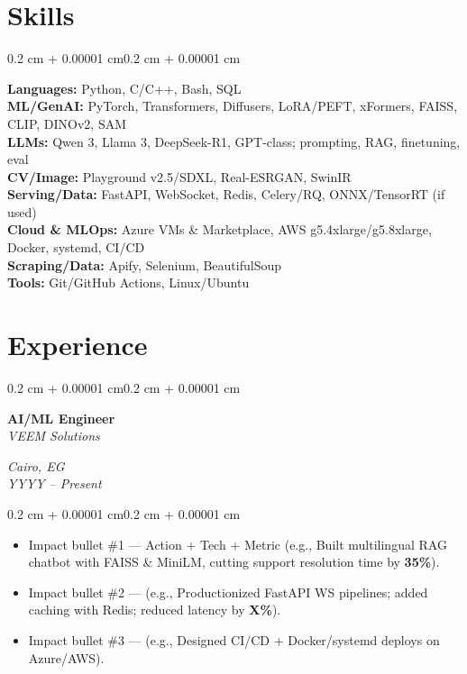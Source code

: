 \documentclass[10pt, letterpaper]{article}
\newenvironment{highlights}{
  \begin{itemize}[
    topsep=0.10 cm,
    parsep=0.10 cm,
    partopsep=0pt,
    itemsep=0pt,
    leftmargin=0.4 cm + 10pt
  ]}
  {\end{itemize}
}
\newenvironment{onecolentry}{
  \begin{adjustwidth}{0.2 cm + 0.00001 cm}{0.2 cm + 0.00001 cm}
}{
  \end{adjustwidth}
}
\newenvironment{twocolentry}[2][]{
  \onecolentry
  \def\secondColumn{#2}
  \setcolumnwidth{\fill, 4.5 cm}
  \begin{paracol}{2}
}{
  \switchcolumn \raggedleft \secondColumn
  \end{paracol}
  \endonecolentry
}
\begin{document}
\section{Skills}
\begin{onecolentry}
  \textbf{Languages:} Python, C/C++, Bash, SQL \\
  \textbf{ML/GenAI:} PyTorch, Transformers, Diffusers, LoRA/PEFT, xFormers, FAISS, CLIP, DINOv2, SAM \\
  \textbf{LLMs:} Qwen 3, Llama 3, DeepSeek-R1, GPT-class; prompting, RAG, finetuning, eval \\
  \textbf{CV/Image:} Playground v2.5/SDXL, Real-ESRGAN, SwinIR \\
  \textbf{Serving/Data:} FastAPI, WebSocket, Redis, Celery/RQ, ONNX/TensorRT (if used) \\
  \textbf{Cloud \& MLOps:} Azure VMs \& Marketplace, AWS g5.4xlarge/g5.8xlarge, Docker, systemd, CI/CD \\
  \textbf{Scraping/Data:} Apify, Selenium, BeautifulSoup \\
  \textbf{Tools:} Git/GitHub Actions, Linux/Ubuntu
\end{onecolentry}

\section{Experience}

\begin{twocolentry}{
  \textit{Cairo, EG} \\
  \textit{YYYY -- Present}}
  \textbf{AI/ML Engineer} \\
  \textit{VEEM Solutions}
\end{twocolentry}
\vspace{0.10 cm}
\begin{onecolentry}
  \begin{highlights}
    \item {Impact bullet \#1 — Action + Tech + Metric (e.g., Built multilingual RAG chatbot with FAISS \& MiniLM, cutting support resolution time by \textbf{35\%}).}
    \item {Impact bullet \#2 — (e.g., Productionized FastAPI WS pipelines; added caching with Redis; reduced latency by \textbf{X\%}).}
    \item {Impact bullet \#3 — (e.g., Designed CI/CD + Docker/systemd deploys on Azure/AWS).}
  \end{highlights}
\end{onecolentry}
\end{document}
